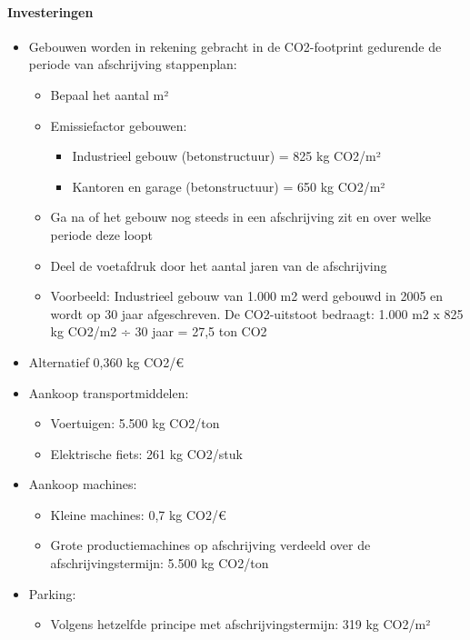 \documentclass[12pt]{article}
\begin{document}
\paragraph{Investeringen}
\begin{itemize}
    \item Gebouwen worden in rekening gebracht in de CO2-footprint
    gedurende de periode van afschrijving stappenplan:\begin{itemize}
        \item Bepaal het aantal m² 
        \item Emissiefactor gebouwen:\begin{itemize}
            \item Industrieel gebouw (betonstructuur) = 825 kg CO2/m²
            \item Kantoren en garage (betonstructuur) = 650 kg CO2/m²
        \end{itemize}
        \item Ga na of het gebouw nog steeds in een afschrijving zit en
        over welke periode deze loopt
        \item Deel de voetafdruk door het aantal jaren van de afschrijving 
        \item Voorbeeld: Industrieel gebouw van 1.000 m2 werd gebouwd
        in 2005 en wordt op 30 jaar afgeschreven. De CO2-uitstoot bedraagt:
        1.000 m2 x 825 kg CO2/m2 ÷ 30 jaar = 27,5 ton CO2
    \end{itemize}
    \item Alternatief 0,360 kg CO2/€
    \item Aankoop transportmiddelen:\begin{itemize}
        \item Voertuigen: 5.500 kg CO2/ton 
        \item Elektrische fiets: 261 kg CO2/stuk
    \end{itemize}
    \item Aankoop machines:\begin{itemize}
        \item Kleine machines: 0,7 kg CO2/€ 
        \item Grote productiemachines op afschrijving verdeeld over de afschrijvingstermijn: 5.500
        kg CO2/ton
    \end{itemize}
    \item Parking:\begin{itemize}
        \item Volgens hetzelfde principe met afschrijvingstermijn: 319 kg CO2/m²
    \end{itemize}
\end{itemize}
\end{document}
